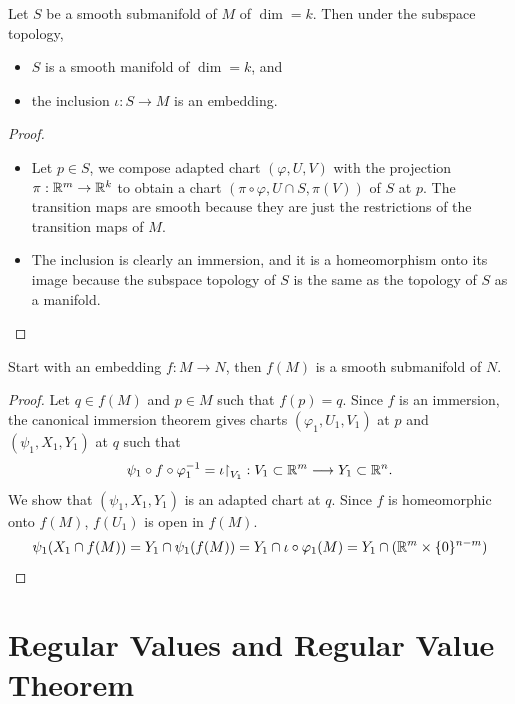 \begin{theorem}
  Let \(S\) be a smooth submanifold of \(M\) of \(\dim = k\). Then under the subspace topology, \begin{itemize}
    \item \(S\) is a smooth manifold of \(\dim = k\), and
    \item the inclusion \(\iota:S\to M\) is an embedding.
  \end{itemize}
\end{theorem}
\begin{proof}
  \begin{itemize}
    \item Let \(p\in S\), we compose adapted chart \((\varphi,U,V)\) with the projection \(\pi:\mathbb{R}^m\to\mathbb{R}^k\) to obtain a chart \((\pi\circ\varphi,U\cap S,\pi(V))\) of \(S\) at \(p\). The transition maps are smooth because they are just the restrictions of the transition maps of \(M\).
    \item The inclusion is clearly an immersion, and it is a homeomorphism onto its image because the subspace topology of \(S\) is the same as the topology of \(S\) as a manifold. 
  \end{itemize}
\end{proof}

\begin{theorem}
  Start with an embedding \(f:M\to N\), then \(f(M)\) is a smooth submanifold of \(N\).
\end{theorem}
\begin{proof}
  Let \(q\in f(M)\) and \(p\in M\) such that \(f(p) = q\). Since \(f\) is an immersion, the canonical immersion theorem gives charts \((\varphi_1,U_1,V_1)\) at \(p\) and \((\psi_1,X_1,Y_1)\) at \(q\) such that \[
    \psi_1\circ f\circ\varphi_1^{-1} = \iota\mathord{\upharpoonright}_{V_1}:
    V_1\subset\mathbb{R}^m\longrightarrow Y_1\subset\mathbb{R}^n.
  \] 
  We show that \((\psi_1,X_1,Y_1)\) is an adapted chart at \(q\).
  Since \(f\) is homeomorphic onto \(f(M)\), \(f(U_1)\) is open in \(f(M)\).
  \begin{align*}
    \psi_1(X_1\cap f(M))
    = Y_1\cap\psi_1(f(M))
    = Y_1\cap\iota\circ\varphi_1(M)
    = Y_1\cap(\mathbb{R}^m\times\{0\}^{n-m})
  \end{align*}
\end{proof}

\section[Regular Values and Regular Value Theorem]{Regular Values and Regular Value Theorem}


